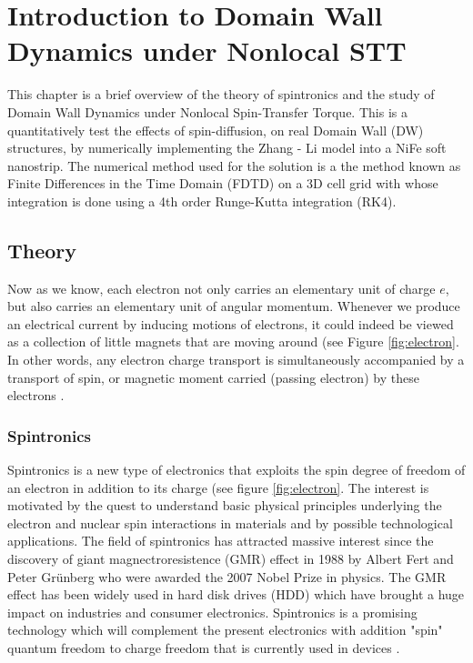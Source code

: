 
\chapter{Introduction to Domain Wall Dynamics under Nonlocal STT} %

\label{Introduction to Domain Wall Dynamics under Nonlocal STT} %



This chapter is a brief overview of the theory of spintronics and the study of Domain Wall Dynamics under Nonlocal Spin-Transfer Torque. This is a quantitatively test the effects of spin-diffusion, on real Domain Wall (DW) structures, by numerically implementing the Zhang - Li model into a NiFe soft nanostrip. The numerical method used for the solution is a the method known as Finite Differences in the Time Domain (FDTD) on a 3D cell grid with whose integration is done using a 4th order Runge-Kutta integration (RK4).

\section{Theory}

Now as we know, each electron not only carries an elementary
unit of charge $e$, but also carries an elementary unit of angular momentum. Whenever we produce an electrical current by inducing
motions of electrons, it could indeed be viewed as a collection of little magnets that are moving around (see Figure \ref{fig:electron}. In other words, any electron charge transport is simultaneously accompanied by a transport of spin, or magnetic moment carried (passing electron) by these electrons \cite{cornell}.

\subsection{Spintronics}

Spintronics is a new type of electronics that exploits the spin degree of freedom of an electron in addition to its charge \cite{spinz} (see figure \ref{fig:electron}. The interest is motivated by the quest to understand basic physical principles underlying the electron and nuclear spin interactions in materials and by possible technological applications. The field of spintronics has attracted massive interest since the discovery of giant magnectroresistence (GMR) effect in 1988 by Albert Fert and Peter Gr\"{u}nberg who were awarded the 2007 Nobel Prize in physics. The GMR effect has been widely used in hard disk drives (HDD) which have brought a huge impact on industries and consumer electronics. Spintronics is a promising technology which will complement the present electronics with addition "spin" quantum freedom to charge freedom that is currently used in devices \cite{nonlocalspin}.

